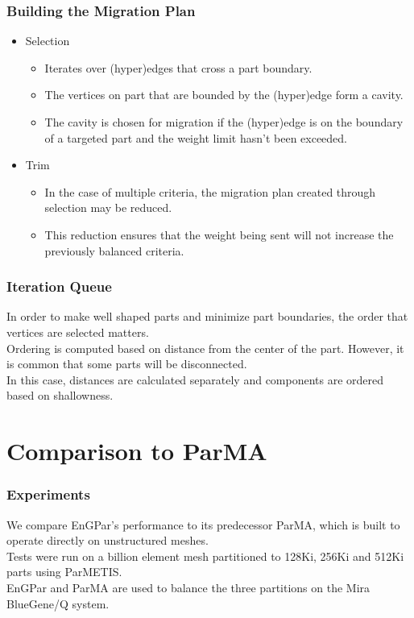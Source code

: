 \documentclass{beamer}
\begin{document}
\begin{frame}
  \frametitle{Building the Migration Plan}
  \begin{itemize}
  \item Selection
    \begin{itemize}
    \item Iterates over (hyper)edges that cross a part boundary.
    \item The vertices on part that are bounded by the (hyper)edge form a cavity.
    \item The cavity is chosen for migration if the (hyper)edge is on the boundary of a targeted part and the weight limit hasn't been exceeded.
    \end{itemize}
  \item Trim %
    \begin{itemize}
    \item In the case of multiple criteria, the migration plan created through selection may be reduced.
    \item This reduction ensures that the weight being sent will not increase the previously balanced criteria.
    \end{itemize}
  \end{itemize}
\end{frame}


\begin{frame}
  \frametitle{Iteration Queue}
  In order to make well shaped parts and minimize part boundaries, the order that vertices are selected matters. \\
  \bigskip
  Ordering is computed based on distance from the center of the part. However, it is common that some parts will be disconnected.\\
  \bigskip
  In this case, distances are calculated separately and components are ordered based on shallowness.
\end{frame}


\section{Comparison to ParMA}

\begin{frame}
  \frametitle{Experiments}
  We compare EnGPar's performance to its predecessor ParMA, which is built to operate directly on unstructured meshes.\\
  \medskip
  Tests were run on a billion element mesh partitioned to 128Ki, 256Ki and 512Ki parts using ParMETIS. \\
  \medskip
  EnGPar and ParMA are used to balance the three partitions on the Mira BlueGene/Q system.
\end{frame}
\end{document}
